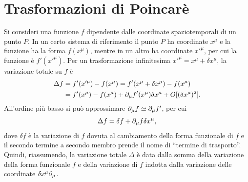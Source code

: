 \section{Trasformazioni di Poincarè}
Si consideri una funzione $f$ dipendente dalle coordinate spaziotemporali di un punto $P$. In un certo sistema di riferimento il punto $P$ ha coordinate $x^\mu$ e la funzione ha la forma $f(x^\mu)$, mentre in un altro ha coordinate $x'^\mu$, per cui la funzione è $f'(x'^\mu)$. Per un trasformazione infinitesima $x'^\mu = x^\mu + \delta x^\mu$, la variazione totale su $f$ è
\begin{equation}
    \begin{split}
        \Delta f &= f'(x'^\mu) - f(x^\mu) = f'(x^\mu + \delta x^\mu) - f(x^\mu) \\
        &= f'(x^\mu) - f(x^\mu) +\partial_\mu f'(x^\mu)\delta x^\mu + O[(\delta x^\mu)^2].
    \end{split} 
\end{equation}
All'ordine più basso si può approssimare $\partial_\mu f \simeq \partial_\mu f'$, per cui
\begin{equation}
    \Delta f = \delta f +\partial_\mu f\delta x^\mu,
\end{equation}
dove $\delta f$ è la variazione di $f$ dovuta al cambiamento della forma funzionale di $f$ e il secondo termine a secondo membro prende il nome di ``termine di trasporto''. Quindi, riassumendo, la variazione totale $\Delta$ è data dalla somma della variazione della forma funzionale $f$ e della variazione di $f$ indotta dalla variazione delle coordinate $\delta x^\mu\partial_\mu$.

